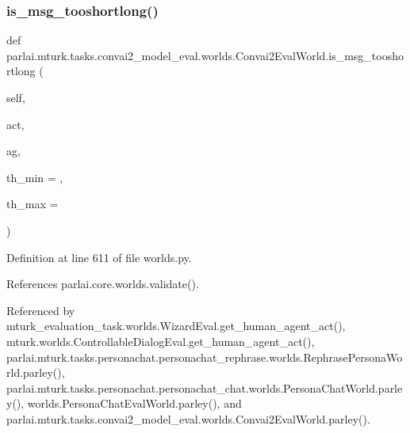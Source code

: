 \subsubsection{\texorpdfstring{is\+\_\+msg\+\_\+tooshortlong()}{is\_msg\_tooshortlong()}}
{\footnotesize\ttfamily def parlai.\+mturk.\+tasks.\+convai2\+\_\+model\+\_\+eval.\+worlds.\+Convai2\+Eval\+World.\+is\+\_\+msg\+\_\+tooshortlong (\begin{DoxyParamCaption}\item[{}]{self,  }\item[{}]{act,  }\item[{}]{ag,  }\item[{}]{th\+\_\+min = {},  }\item[{}]{th\+\_\+max = {} }\end{DoxyParamCaption})}



Definition at line 611 of file worlds.\+py.



References parlai.\+core.\+worlds.\+validate().



Referenced by mturk\+\_\+evaluation\+\_\+task.\+worlds.\+Wizard\+Eval.\+get\+\_\+human\+\_\+agent\+\_\+act(), mturk.\+worlds.\+Controllable\+Dialog\+Eval.\+get\+\_\+human\+\_\+agent\+\_\+act(), parlai.\+mturk.\+tasks.\+personachat.\+personachat\+\_\+rephrase.\+worlds.\+Rephrase\+Persona\+World.\+parley(), parlai.\+mturk.\+tasks.\+personachat.\+personachat\+\_\+chat.\+worlds.\+Persona\+Chat\+World.\+parley(), worlds.\+Persona\+Chat\+Eval\+World.\+parley(), and parlai.\+mturk.\+tasks.\+convai2\+\_\+model\+\_\+eval.\+worlds.\+Convai2\+Eval\+World.\+parley().

